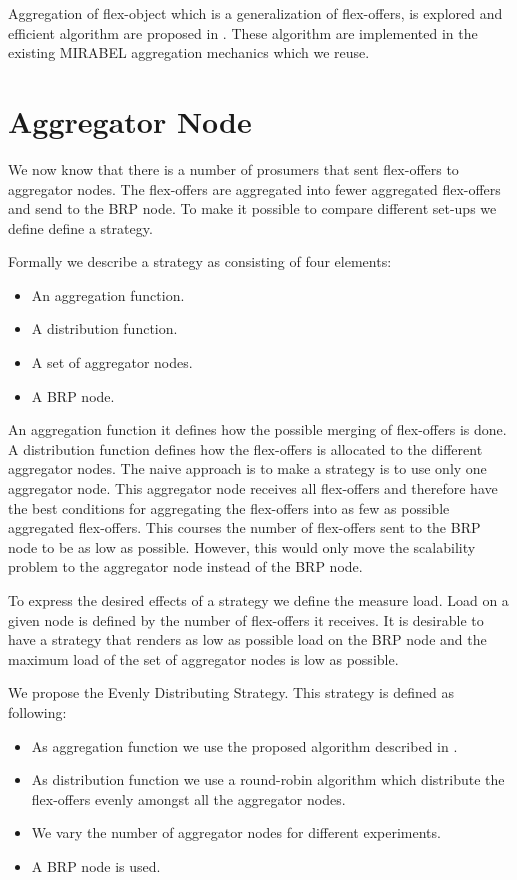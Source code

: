 \documentclass{ifacconf}
\begin{document}
Aggregation of flex-object which is a generalization of flex-offers, is explored and efficient algorithm are proposed in \cite{ssdbm}. 
These algorithm are implemented in the existing MIRABEL aggregation mechanics which we reuse.

\section{Aggregator Node}

We now know that there is a number of prosumers that sent flex-offers to aggregator nodes. 
The flex-offers are aggregated into fewer aggregated flex-offers and send to the BRP node.
To make it possible to compare different set-ups we define define a strategy.

Formally we describe a strategy as consisting of four elements:
\begin{itemize}
	\item An aggregation function.
	\item A distribution function. 
	\item A set of aggregator nodes.
	\item A BRP node.
\end{itemize} 

An aggregation function it defines how the possible merging of flex-offers is done.
A distribution function defines how the flex-offers is allocated to the different aggregator nodes.
The naive approach is to make a strategy is to use only one aggregator node. 
This aggregator node receives all flex-offers and therefore have the best conditions for aggregating the flex-offers into as few as possible aggregated flex-offers. 
This courses the number of flex-offers sent to the BRP node to be as low as possible. 
However, this would only move the scalability problem to the aggregator node instead of the BRP node. 

To express the desired effects of a strategy we define the measure load.
Load on a given node is defined by the number of flex-offers it receives.
It is desirable to have a strategy that renders as low as possible load on the BRP node and the maximum load of the set of aggregator nodes is low as possible.  


We propose the Evenly Distributing Strategy.
This strategy is defined as following:
\begin{itemize}
	\item As aggregation function we use the proposed algorithm described in \cite{ssdbm}.
	\item As distribution function we use a round-robin algorithm which distribute the flex-offers evenly amongst all the aggregator nodes.
	\item We vary the number of aggregator nodes for different experiments.
	\item A BRP node is used.
\end{itemize}
\end{document}

